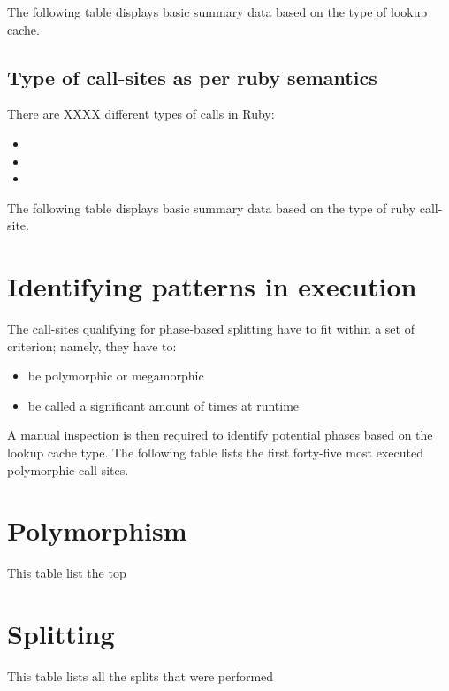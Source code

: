 \documentclass[preprint]{acmart}
\begin{document}
\CallTargetDistrib

The following table displays basic summary data based on the type of lookup cache.

\SummaryPerLookupCache

\subsection{Type of call-sites as per ruby semantics}

There are XXXX different types of calls in Ruby:
\begin{itemize}
\item 
\item 
\item 
\end{itemize}

The following table displays basic summary data based on the type of ruby call-site.

\SummaryPerRubyCallSite

\section{Identifying patterns in execution}

The call-sites qualifying for phase-based splitting have to fit within a set of criterion; namely, they have to:
 \begin{itemize}
 \item be polymorphic or megamorphic
 \item be called a significant amount of times at runtime
 \end{itemize}

A manual inspection is then required to identify potential phases based on the lookup cache type. The following table lists the first forty-five most executed polymorphic call-sites.

\begin{landscape}

\SuperHottestMegamorphic{}

\end{landscape}

\appendix

\section{Polymorphism}
This table list the top 

\begin{landscape}

\HottestMegamorphic{}

\end{landscape}

\section{Splitting}

This table lists all the splits that were performed

\SplitDistrib{}




\end{document}
